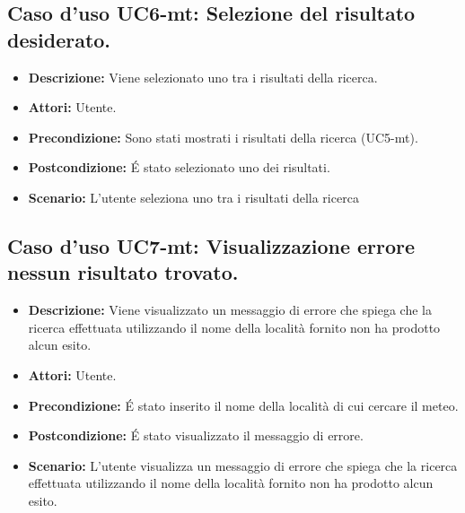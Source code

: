 \subsection{Caso d'uso UC6-mt: Selezione del risultato desiderato.}
\begin{itemize}
\item[]\textbf{Descrizione:} Viene selezionato uno tra i risultati della ricerca.
\item[]\textbf{Attori:} Utente. 
\item[]\textbf{Precondizione:} Sono stati mostrati i risultati della ricerca (UC5-mt). 
\item[]\textbf{Postcondizione:} \'E stato selezionato uno dei risultati. 
\item[]\textbf{Scenario:}
L'utente seleziona uno tra i risultati della ricerca 
\end{itemize}

\subsection{Caso d'uso UC7-mt: Visualizzazione errore nessun risultato trovato.}
\begin{itemize}
\item[]\textbf{Descrizione:} Viene visualizzato un messaggio di errore che spiega che la ricerca effettuata utilizzando il nome della località fornito non ha prodotto alcun esito.
\item[]\textbf{Attori:} Utente. 
\item[]\textbf{Precondizione:} \'E stato inserito il nome della località di cui cercare il meteo. 
\item[]\textbf{Postcondizione:} \'E stato visualizzato il messaggio di errore. 
\item[]\textbf{Scenario:}
L'utente visualizza un messaggio di errore che spiega che la ricerca effettuata utilizzando il nome della località fornito non ha prodotto alcun esito. 
\end{itemize}

\clearpage

